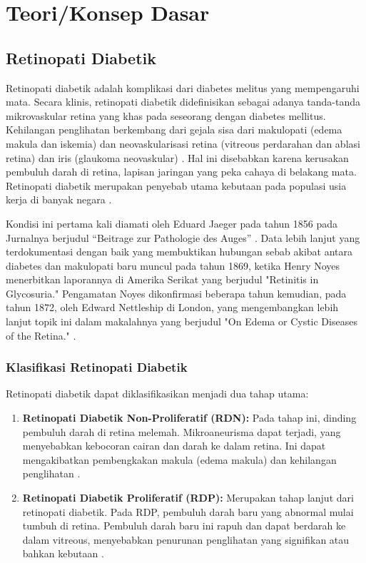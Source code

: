 \section{Teori/Konsep Dasar}
\label{sec:22}

\subsection{Retinopati Diabetik}
Retinopati diabetik adalah komplikasi dari diabetes melitus yang mempengaruhi mata. Secara klinis, retinopati diabetik didefinisikan sebagai adanya tanda-tanda mikrovaskular retina yang khas pada seseorang dengan diabetes mellitus. Kehilangan penglihatan berkembang dari gejala sisa dari makulopati (edema makula dan iskemia) dan neovaskularisasi retina (vitreous perdarahan dan ablasi retina) dan iris (glaukoma neovaskular) \parencite{Cheung2010}. 
Hal ini disebabkan karena kerusakan pembuluh darah di retina, lapisan jaringan yang peka cahaya di belakang mata. Retinopati diabetik merupakan penyebab utama kebutaan pada populasi usia kerja di banyak negara \parencite{fong2004diabetic}.

Kondisi ini pertama kali diamati oleh Eduard Jaeger pada tahun 1856 pada Jurnalnya berjudul “Beitrage zur Pathologie des Auges” \parencite{jaeger1855}. Data lebih lanjut yang terdokumentasi dengan baik yang membuktikan hubungan sebab akibat antara diabetes dan makulopati baru muncul pada tahun 1869, ketika Henry Noyes menerbitkan laporannya di Amerika Serikat yang berjudul "Retinitis in Glycosuria." Pengamatan Noyes dikonfirmasi beberapa tahun kemudian, pada tahun 1872, oleh Edward Nettleship di London, yang mengembangkan lebih lanjut topik ini dalam makalahnya yang berjudul "On Edema or Cystic Diseases of the Retina." \parencite{Wolfensberger2001}.

\subsubsection{Klasifikasi Retinopati Diabetik}

Retinopati diabetik dapat diklasifikasikan menjadi dua tahap utama:

\begin{enumerate}
    \item \textbf{Retinopati Diabetik Non-Proliferatif (RDN):} Pada tahap ini, dinding pembuluh darah di retina melemah. Mikroaneurisma dapat terjadi, yang menyebabkan kebocoran cairan dan darah ke dalam retina. Ini dapat mengakibatkan pembengkakan makula (edema makula) dan kehilangan penglihatan \parencite{aiello1998diabetic}.
    \item \textbf{Retinopati Diabetik Proliferatif (RDP):} Merupakan tahap lanjut dari retinopati diabetik. Pada RDP, pembuluh darah baru yang abnormal mulai tumbuh di retina. Pembuluh darah baru ini rapuh dan dapat berdarah ke dalam vitreous, menyebabkan penurunan penglihatan yang signifikan atau bahkan kebutaan \parencite{king1998diabetes}.
\end{enumerate}

